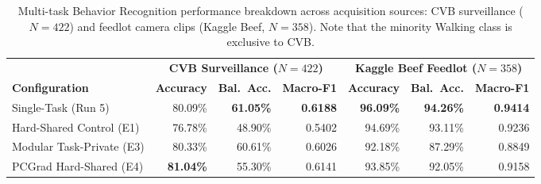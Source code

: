 \begin{table}[htbp]
\centering\footnotesize
\caption[Multi-task Behavior source-disjoint breakdown]{Multi-task Behavior Recognition performance breakdown across acquisition sources: CVB surveillance ($N = 422$) and feedlot camera clips (Kaggle Beef, $N = 358$). Note that the minority Walking class is exclusive to CVB.}
\label{tab:mtl_behavior_source}
\setlength{\tabcolsep}{1.4pt}
\begin{tabular}{lrrrrrr}
\toprule
& \multicolumn{3}{c}{\textbf{CVB Surveillance ($N = 422$)}} & \multicolumn{3}{c}{\textbf{Kaggle Beef Feedlot ($N = 358$)}} \\
\cmidrule(lr){2-4} \cmidrule(lr){5-7}
\textbf{Configuration} & \textbf{Accuracy} & \textbf{Bal.~Acc.} & \textbf{Macro-F1} & \textbf{Accuracy} & \textbf{Bal.~Acc.} & \textbf{Macro-F1} \\
\midrule
Single-Task (Run 5) & 80.09\% & \textbf{61.05\%} & \textbf{0.6188} & \textbf{96.09\%} & \textbf{94.26\%} & \textbf{0.9414} \\
Hard-Shared Control (E1) & 76.78\% & 48.90\% & 0.5402 & 94.69\% & 93.11\% & 0.9236 \\
Modular Task-Private (E3) & 80.33\% & 60.61\% & 0.6026 & 92.18\% & 87.29\% & 0.8849 \\
PCGrad Hard-Shared (E4) & \textbf{81.04\%} & 55.30\% & 0.6141 & 93.85\% & 92.05\% & 0.9158 \\
\bottomrule
\end{tabular}
\end{table}
